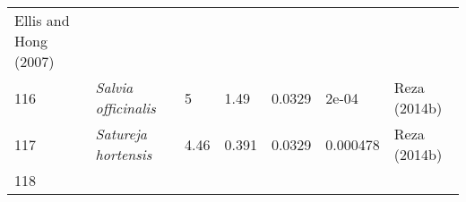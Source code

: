 \documentclass[]{article}
\begin{document}
\begin{longtable}[]{@{}lllllll@{}}
\begin{minipage}[t]{0.23\columnwidth}
Ellis and Hong (2007)\strut
\end{minipage}\tabularnewline
\begin{minipage}[t]{0.05\columnwidth}\raggedright
116\strut
\end{minipage} & \begin{minipage}[t]{0.23\columnwidth}\raggedright
\emph{Salvia officinalis}\strut
\end{minipage} & \begin{minipage}[t]{0.05\columnwidth}\raggedright
5\strut
\end{minipage} & \begin{minipage}[t]{0.08\columnwidth}\raggedright
1.49\strut
\end{minipage} & \begin{minipage}[t]{0.08\columnwidth}\raggedright
0.0329\strut
\end{minipage} & \begin{minipage}[t]{0.08\columnwidth}\raggedright
2e-04\strut
\end{minipage} & \begin{minipage}[t]{0.23\columnwidth}\raggedright
Reza (2014b)\strut
\end{minipage}\tabularnewline
\begin{minipage}[t]{0.05\columnwidth}\raggedright
117\strut
\end{minipage} & \begin{minipage}[t]{0.23\columnwidth}\raggedright
\emph{Satureja hortensis}\strut
\end{minipage} & \begin{minipage}[t]{0.05\columnwidth}\raggedright
4.46\strut
\end{minipage} & \begin{minipage}[t]{0.08\columnwidth}\raggedright
0.391\strut
\end{minipage} & \begin{minipage}[t]{0.08\columnwidth}\raggedright
0.0329\strut
\end{minipage} & \begin{minipage}[t]{0.08\columnwidth}\raggedright
0.000478\strut
\end{minipage} & \begin{minipage}[t]{0.23\columnwidth}\raggedright
Reza (2014b)\strut
\end{minipage}\tabularnewline
\begin{minipage}[t]{0.05\columnwidth}\raggedright
118\strut
\end{minipage} & \begin{minipage}[t]{0.23\columnwidth}\raggedright

\end{minipage}
\end{longtable}
\end{document}
